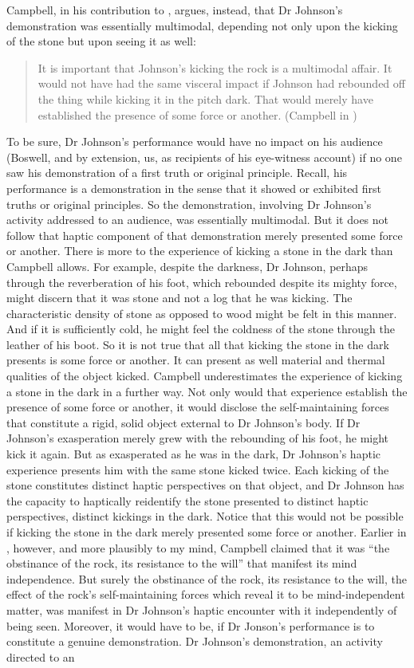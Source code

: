 Campbell, in his contribution to \citet[71]{Campbell:2014aa}, argues, instead, that Dr Johnson's demonstration was essentially multimodal, depending not only upon the kicking of the stone but upon seeing it as well:
\begin{quote}
	It is important that Johnson's kicking the rock is a multimodal affair. It would not have had the same visceral impact if Johnson had rebounded off the thing while kicking it in the pitch dark. That would merely have established the presence of some force or another. (Campbell in \citealt[71]{Campbell:2014aa})
\end{quote}
To be sure, Dr Johnson's performance would have no impact on his audience (Boswell, and by extension, us, as recipients of his eye-witness account) if no one saw his demonstration of a first truth or original principle. Recall, his performance is a demonstration in the sense that it showed or exhibited first truths or original principles. So the demonstration, involving Dr Johnson's activity addressed to an audience, was essentially multimodal. But it does not follow that haptic component of that demonstration merely presented some force or another. There is more to the experience of kicking a stone in the dark than Campbell allows. For example, despite the darkness, Dr Johnson, perhaps through the reverberation of his foot, which rebounded despite its mighty force, might discern that it was stone and not a log that he was kicking. The characteristic density of stone as opposed to wood might be felt in this manner. And if it is sufficiently cold, he might feel the coldness of the stone through the leather of his boot. So it is not true that all that kicking the stone in the dark presents is some force or another. It can present as well material and thermal qualities of the object kicked. Campbell underestimates the experience of kicking a stone in the dark in a further way. Not only would that experience establish the presence of some force or another, it would disclose the self-maintaining forces that constitute a rigid, solid object external to Dr Johnson's body. If Dr Johnson's exasperation merely grew with the rebounding of his foot, he might kick it again. But as exasperated as he was in the dark, Dr Johnson's haptic experience presents him with the same stone kicked twice. Each kicking of the stone constitutes distinct haptic perspectives on that object, and Dr Johnson has the capacity to haptically reidentify the stone presented to distinct haptic perspectives, distinct kickings in the dark. Notice that this would not be possible if kicking the stone in the dark merely presented some force or another. Earlier in \citet[26]{Campbell:2014aa}, however, and more plausibly to my mind, Campbell claimed that it was ``the obstinance of the rock, its resistance to the will'' that manifest its mind independence. But surely the obstinance of the rock, its resistance to the will, the effect of the rock's self-maintaining forces which reveal it to be mind-independent matter, was manifest in Dr Johnson's haptic encounter with it independently of being seen. Moreover, it would have to be, if Dr Jonson's performance is to constitute a genuine demonstration. Dr Johnson's demonstration, an activity directed to an 